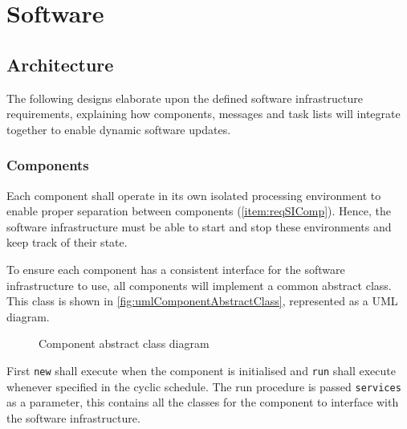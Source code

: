 \section{Software} \label{sec:softwareDesign}


\subsection{Architecture} \label{sec:designArch}
The following designs elaborate upon the defined software infrastructure requirements, explaining how components, messages and task lists will integrate together to enable dynamic software updates.


\subsubsection{Components}
Each component shall operate in its own isolated processing environment to enable proper separation between components (\ref{item:reqSIComp}). Hence, the software infrastructure must be able to start and stop these environments and keep track of their state.

To ensure each component has a consistent interface for the software infrastructure to use, all components will implement a common abstract class. This class is shown in \autoref{fig:umlComponentAbstractClass}, represented as a UML diagram.

\begin{figure}[ht]
    \centering
    \caption[Component abstract class diagram]
    {Component abstract class diagram}
    \label{fig:umlComponentAbstractClass}
\end{figure}

First \verb|new| shall execute when the component is initialised and \verb|run| shall execute whenever specified in the cyclic schedule. The run procedure is passed \verb|services| as a parameter, this contains all the classes for the component to interface with the software infrastructure.

